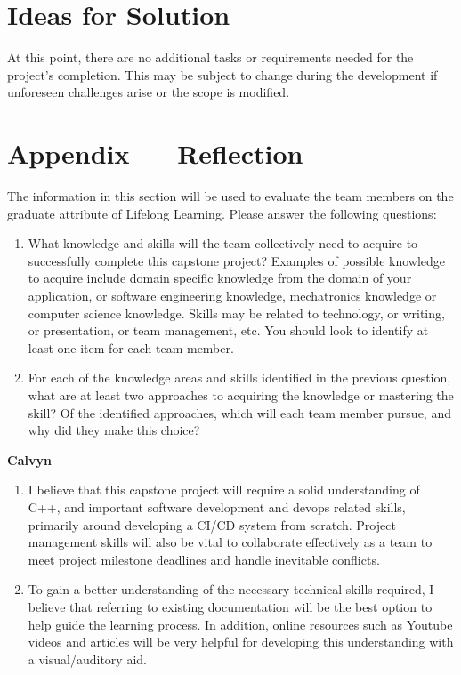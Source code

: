\documentclass[12pt]{article}
\begin{document}
\section{Ideas for Solution}
At this point, there are no additional tasks or requirements needed for the project's completion. This may be subject to change during the development if unforeseen challenges arise or the scope is modified.

\newpage{}
\section*{Appendix --- Reflection}

The information in this section will be used to evaluate the team members on the
graduate attribute of Lifelong Learning.  Please answer the following questions:

\begin{enumerate}
  \item What knowledge and skills will the team collectively need to acquire to
  successfully complete this capstone project?  Examples of possible knowledge
  to acquire include domain specific knowledge from the domain of your
  application, or software engineering knowledge, mechatronics knowledge or
  computer science knowledge.  Skills may be related to technology, or writing,
  or presentation, or team management, etc.  You should look to identify at
  least one item for each team member.
  \item For each of the knowledge areas and skills identified in the previous
  question, what are at least two approaches to acquiring the knowledge or
  mastering the skill?  Of the identified approaches, which will each team
  member pursue, and why did they make this choice?
\end{enumerate}


\textbf{Calvyn}

\begin{enumerate}

\item I believe that this capstone project will require a solid understanding of C++, and important software development and devops related skills, primarily around developing a CI/CD system from scratch. Project management skills will also be vital to collaborate effectively as a team to meet project milestone deadlines and handle inevitable conflicts.

\item To gain a better understanding of the necessary technical skills required, I believe that referring to existing documentation will be the best option to help guide the learning process. In addition, online resources such as Youtube videos and articles will be very helpful for developing this understanding with a visual/auditory aid.


\end{enumerate}
\end{document}
